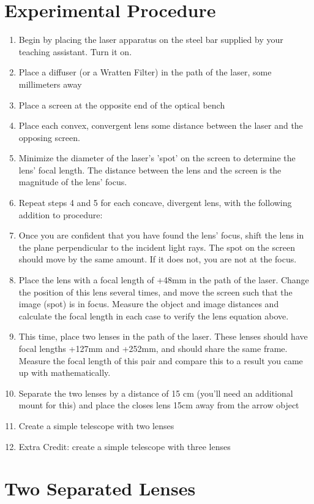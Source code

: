 \documentclass{amsart}
\begin{document}
\section{Experimental Procedure}
\begin{enumerate}
\item Begin by placing the laser apparatus on the steel bar supplied by your teaching assistant. Turn it on.
\item Place a diffuser (or a Wratten Filter) in the path of the laser, some millimeters away
\item Place a screen at the opposite end of the optical bench
\item Place each convex, convergent lens some distance between the laser and the opposing screen.
\item Minimize the diameter of the laser's 'spot' on the screen to determine the lens' focal length. The distance between the lens and the screen is the magnitude of the lens' focus.
\item Repeat steps 4 and 5 for each concave, divergent lens, with the following addition to procedure:
\item Once you are confident that you have found the lens' focus, shift the lens in the plane perpendicular to the incident light rays. The spot on the screen should move by the same amount. If it does not, you are not at the focus.
\item Place the lens with a focal length of  +48mm in the path of the laser. Change the position of this lens several times, and move the screen such that the image (spot) is in focus.  Measure the object and image distances and calculate the focal length in each case to verify the lens equation above.
\item This time, place two lenses in the path of the laser. These lenses should have focal lengths +127mm and +252mm, and should share the same frame. Measure the focal length of this pair and compare this to a result you came up with mathematically.
\item Separate the two lenses by a distance of 15 cm (you'll need an additional mount for this) and place the closes lens 15cm away from the arrow object
\item Create a simple telescope with two lenses
\item Extra Credit: create a simple telescope with three lenses
\end{enumerate}

\section{Two Separated Lenses}
\end{document}
